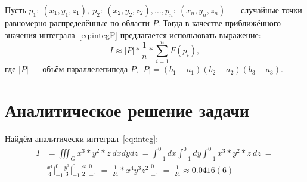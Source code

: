 \documentclass{article}
\begin{document}
    Пусть \(p_1:\ (x_1, y_1, z_1),\ p_2:\ (x_2, y_2, z_2),\ldots, p_n:\ (x_n, y_n, z_n)\)~---
    случайные точки равномерно распределённые по области \(P\). Тогда в качестве приближённого
    значения интеграла~\ref{eq:integF} предлагается использовать выражение:
    \begin{equation}
        I \approx |P| * \frac{1}{n} *\sum_{i=1}^n F(p_i),
    \end{equation}
    где \(|P|\) — объём параллелепипеда \(P\), \(|P| = (b_1 − a_1)(b_2 − a_2)(b_3 − a_3)\).
\section{Аналитическое решение задачи}
    Найдём аналитически интеграл~\ref{eq:integ}:
    \begin{equation}
        \begin{aligned}
        I &= \iiint_G x^3*y^2*z\ dxdydz\ = \int_{-1}^{0} dx\int_{-1}^{0} dy \int_{-1}^{0} x^3*y^2*z\ dz\ =\\
          &\frac{x^4}{4}\biggr\rvert_{-1}^{0}\frac{y^3}{3}\biggr\rvert_{-1}^{0}\frac{z^2}{2}\biggr\rvert_{-1}^{0}\ =\ 
            \frac{1}{24} * x^4y^3z^2\biggr\rvert_{-1}^{0}\ =\ \frac{1}{24} \approx 0.0416(6)
        \end{aligned}
    \end{equation}
\end{document}
